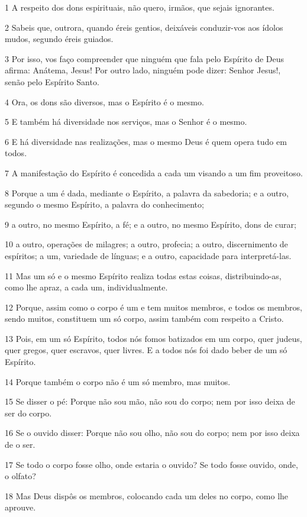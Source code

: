 \par 1 A respeito dos dons espirituais, não quero, irmãos, que sejais ignorantes.
\par 2 Sabeis que, outrora, quando éreis gentios, deixáveis conduzir-vos aos ídolos mudos, segundo éreis guiados.
\par 3 Por isso, vos faço compreender que ninguém que fala pelo Espírito de Deus afirma: Anátema, Jesus! Por outro lado, ninguém pode dizer: Senhor Jesus!, senão pelo Espírito Santo.
\par 4 Ora, os dons são diversos, mas o Espírito é o mesmo.
\par 5 E também há diversidade nos serviços, mas o Senhor é o mesmo.
\par 6 E há diversidade nas realizações, mas o mesmo Deus é quem opera tudo em todos.
\par 7 A manifestação do Espírito é concedida a cada um visando a um fim proveitoso.
\par 8 Porque a um é dada, mediante o Espírito, a palavra da sabedoria; e a outro, segundo o mesmo Espírito, a palavra do conhecimento;
\par 9 a outro, no mesmo Espírito, a fé; e a outro, no mesmo Espírito, dons de curar;
\par 10 a outro, operações de milagres; a outro, profecia; a outro, discernimento de espíritos; a um, variedade de línguas; e a outro, capacidade para interpretá-las.
\par 11 Mas um só e o mesmo Espírito realiza todas estas coisas, distribuindo-as, como lhe apraz, a cada um, individualmente.
\par 12 Porque, assim como o corpo é um e tem muitos membros, e todos os membros, sendo muitos, constituem um só corpo, assim também com respeito a Cristo.
\par 13 Pois, em um só Espírito, todos nós fomos batizados em um corpo, quer judeus, quer gregos, quer escravos, quer livres. E a todos nós foi dado beber de um só Espírito.
\par 14 Porque também o corpo não é um só membro, mas muitos.
\par 15 Se disser o pé: Porque não sou mão, não sou do corpo; nem por isso deixa de ser do corpo.
\par 16 Se o ouvido disser: Porque não sou olho, não sou do corpo; nem por isso deixa de o ser.
\par 17 Se todo o corpo fosse olho, onde estaria o ouvido? Se todo fosse ouvido, onde, o olfato?
\par 18 Mas Deus dispôs os membros, colocando cada um deles no corpo, como lhe aprouve.
